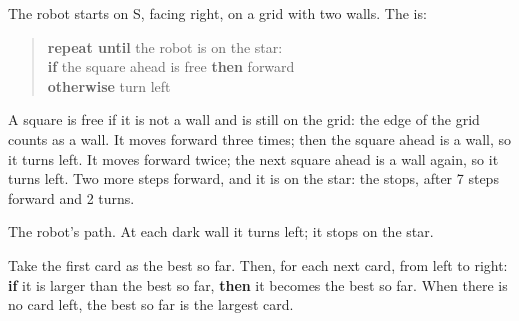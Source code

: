 \begin{example}\label{ex:g4:algorithms-repeat-and-decide:maze}
The robot starts on S, facing right, on a grid with two walls. The 
is:
\begin{quote}
\textbf{repeat until} the robot is on the star:\\
\hspace*{1.5em}\textbf{if} the square ahead is free \textbf{then} forward\\
\hspace*{1.5em}\textbf{otherwise} turn left
\end{quote}
A square is free if it is not a wall and is still on the grid: the edge of the
grid counts as a wall.
It moves forward three times; then the square ahead is a wall, so it turns
left. It moves forward twice; the next square ahead is a wall again, so it
turns left. Two more steps forward, and it is on the star: the  stops,
after 7 steps forward and 2 turns.
\end{example}

\begin{omfigure}

{\small The robot's path. At each dark wall it turns left; it stops on the
star.}
\label{fig:g4:algorithms-repeat-and-decide:maze}
\end{omfigure}

\begin{method}\label{met:g4:algorithms-repeat-and-decide:largest}
Take the first card as the best so far. Then, for each next card, from left to
right: \textbf{if} it is larger than the best so far, \textbf{then} it becomes
the best so far. When there is no card left, the best so far is the largest
card.
\end{method}

